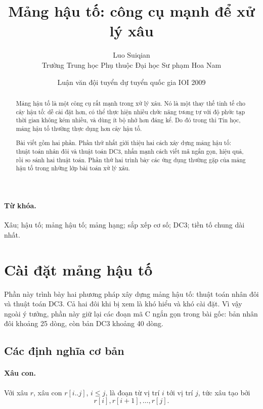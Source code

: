 \documentclass[11pt]{article}
\title{Mảng hậu tố: công cụ mạnh để xử lý xâu}
\author{Luo Suiqian\\Trường Trung học Phụ thuộc Đại học Sư phạm Hoa Nam}
\date{Luận văn đội tuyển dự tuyển quốc gia IOI 2009}
\begin{document}
\maketitle


\begin{abstract}
Mảng hậu tố là một công cụ rất mạnh trong xử lý xâu. Nó là một thay thế tinh
tế cho cây hậu tố: dễ cài đặt hơn, có thể thực hiện nhiều chức năng tương tự
với độ phức tạp thời gian không kém nhiều, và dùng ít bộ nhớ hơn đáng kể. Do
đó trong thi Tin học, mảng hậu tố thường thực dụng hơn cây hậu tố.

Bài viết gồm hai phần. Phần thứ nhất giới thiệu hai cách xây dựng mảng hậu tố:
thuật toán nhân đôi và thuật toán DC3, nhấn mạnh cách viết mã ngắn gọn, hiệu
quả, rồi so sánh hai thuật toán. Phần thứ hai trình bày các ứng dụng thường
gặp của mảng hậu tố trong những lớp bài toán xử lý xâu.
\end{abstract}

\paragraph{Từ khóa.}
Xâu; hậu tố; mảng hậu tố; mảng hạng; sắp xếp cơ số; DC3; tiền tố chung dài
nhất.

\tableofcontents

\section{Cài đặt mảng hậu tố}

Phần này trình bày hai phương pháp xây dựng mảng hậu tố: thuật toán nhân đôi
và thuật toán DC3. Cả hai đôi khi bị xem là khó hiểu và khó cài đặt. Vì vậy
ngoài ý tưởng, phần này giữ lại các đoạn mã C ngắn gọn trong bài gốc: bản
nhân đôi khoảng 25 dòng, còn bản DC3 khoảng 40 dòng.

\subsection{Các định nghĩa cơ bản}

\paragraph{Xâu con.}
Với xâu \(r\), xâu con \(r[i..j]\), \(i\le j\), là đoạn từ vị trí \(i\) tới
vị trí \(j\), tức xâu tạo bởi
\[
  r[i],r[i+1],\ldots,r[j].
\]
\end{document}
